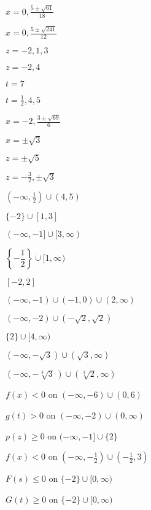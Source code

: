 \begin{shortexenum}
\item  $x = 0, \frac{5\pm \sqrt{61}}{18}$
\item  $x = 0, \frac{5 \pm \sqrt{241}}{12}$
\item $z = -2,1,3$
\item $z=-2,4$
\item $t=7$
\item $t = \frac{1}{2}, 4, 5$
\item $x = -2, \frac{3 \pm \sqrt{69}}{6}$
\item $x = \pm \sqrt{3}$
\item $z = \pm \sqrt{5}$
\item $z = -\frac{3}{2}, \pm \sqrt{3}$
\item $(-\infty, \frac{1}{2}) \cup (4, 5)$
\item $\{-2\} \cup [1, 3]$
\item $(-\infty, -1] \cup [3, \infty)$
\item $\left\{ -\dfrac{1}{2} \right\} \cup [1, \infty)$
\item $[-2,2]$
\item $\left(-\infty, -1 \right) \cup \left(-1, 0 \right) \cup (2, \infty)$
\item $(-\infty, -2) \cup \left(-\sqrt{2}, \sqrt{2} \right)$
\item $\{2 \} \cup [4,\infty)$
\item $(-\infty, -\sqrt{3}) \cup (\sqrt{3}, \infty)$
\item $(-\infty, -\sqrt[3]{3}\,) \cup (\sqrt[3]{2}, \infty)$
\item $f(x) < 0$ on $(-\infty, -6) \cup (0, 6)$
\item $g(t) > 0$ on $(-\infty, -2) \cup (0, \infty)$
\item $p(z) \geq 0$ on $(-\infty, -1] \cup \{ 2\}$
\item $f(x) < 0$ on $\left( -\infty, -\frac{1}{2} \right) \cup \left(-\frac{1}{2}, 3 \right)$
\item $F(s) \leq 0$ on $\{-2\} \cup [0, \infty)$
\item $G(t) \geq 0$ on $\{-2\} \cup [0, \infty)$
\end{shortexenum}

